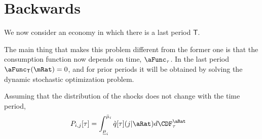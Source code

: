 \documentclass[../BufferStockTheory.tex]{subfiles}\usepackage{ApndxSteadyState}
\begin{document}
  

  \begin{comment}

    \begin{align}
           & = \left(\frac{1}{2}\right)\left(\erf(\Top{\SetSub}_{\this}-\Bot{\SetSub}_{\this})-\erf(\Bot{\SetSub}_{\this}-\Bot{\SetSub}_{\this})\right)
    \end{align}
  \end{comment}

  \begin{comment}
    Finally, for $a < b$ defining 
    \begin{align}
      \mathfrak{C}(a,b) & \equiv  \CDF^{\tShk}(b)-\CDF^{\tShk}(a)
    \end{align}

    so
    \begin{align}
      \PTrns_{\this,\that} &= \int_{\Bot{\SetSub}_{\this}}^{\Top{\SetSub}_{\this}} \mathfrak{C}(\point-\underline{\point}_{\that},\point-\bar{\point}_{\that})d\CDF^{\point}
    \end{align}
  \end{comment}

  \section{Backwards}

  \newcommand{\last}{\mathsf{T}}
  We now consider an economy in which there is a last period $\last$.

  The main thing that makes this problem different from the former one is that the consumption function now depends on time, $\aFunc_{\tAbs}$.  In the last period $\aFunc_{\last}(\mRat) = 0$, and for prior periods it will be obtained by solving the dynamic stochastic optimization problem.

  Assuming that the distribution of the shocks does not change with the time period, 
  \begin{align}
    \PTrns_{\this,\that}[\tAbs] &= \int_{\Bot{\SetSub}_{\this}}^{\Top{\SetSub}_{\this}} \Nxt{\pDistDscr}[\tAbs](\that|\point) d\CDF^{\point}_{\tAbs}
  \end{align}
\end{document}

